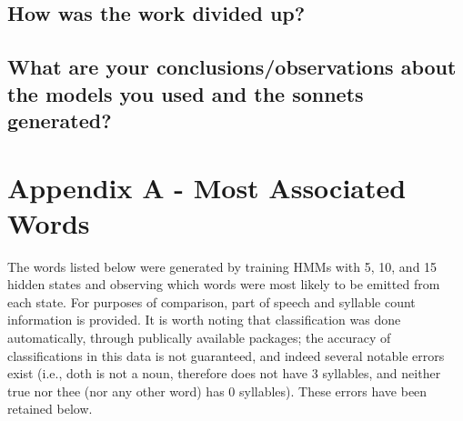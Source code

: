 \subsection{How was the work divided up?}
\subsection{What are your conclusions/observations about the models you used and the sonnets generated?}

\pagebreak
\section{Appendix A - Most Associated Words}
The words listed below were generated by training HMMs with 5, 10, and 15 hidden states and observing which words were most likely to be emitted from each state. For purposes of comparison, part of speech and syllable count information is provided. It is worth noting that classification was done automatically, through publically available packages; the accuracy of classifications in this data is not guaranteed, and indeed several notable errors exist (i.e., doth is not a noun, therefore does not have 3 syllables, and neither true nor thee (nor any other word) has 0 syllables). These errors have been retained below.

